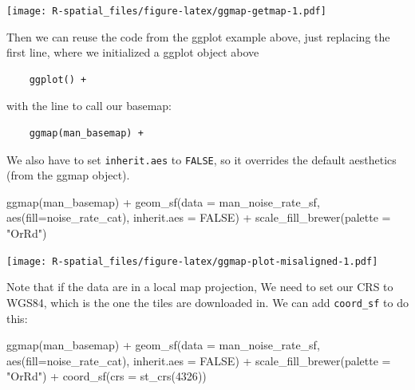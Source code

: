 \documentclass[
  11pt,
]{book}
\newenvironment{Shaded}{\begin{snugshade}}{\end{snugshade}}
\newcommand{\AttributeTok}[1]{\textcolor[rgb]{0.77,0.63,0.00}{#1}}
\newcommand{\ConstantTok}[1]{\textcolor[rgb]{0.00,0.00,0.00}{#1}}
\newcommand{\DecValTok}[1]{\textcolor[rgb]{0.00,0.00,0.81}{#1}}
\newcommand{\FunctionTok}[1]{\textcolor[rgb]{0.00,0.00,0.00}{#1}}
\newcommand{\NormalTok}[1]{#1}
\newcommand{\SpecialCharTok}[1]{\textcolor[rgb]{0.00,0.00,0.00}{#1}}
\newcommand{\StringTok}[1]{\textcolor[rgb]{0.31,0.60,0.02}{#1}}
\begin{document}
\texttt{[image: R-spatial\_files/figure-latex/ggmap-getmap-1.pdf]}

Then we can reuse the code from the ggplot example above, just replacing the first line, where we initialized a ggplot object above

\begin{verbatim}
    ggplot() + 
\end{verbatim}

with the line to call our basemap:

\begin{verbatim}
    ggmap(man_basemap) +
\end{verbatim}

We also have to set \texttt{inherit.aes} to \texttt{FALSE}, so it overrides the default aesthetics (from the ggmap object).

\begin{Shaded}
\begin{Highlighting}[]
\FunctionTok{ggmap}\NormalTok{(man\_basemap) }\SpecialCharTok{+}
  \FunctionTok{geom\_sf}\NormalTok{(}\AttributeTok{data =}\NormalTok{ man\_noise\_rate\_sf, }\FunctionTok{aes}\NormalTok{(}\AttributeTok{fill=}\NormalTok{noise\_rate\_cat), }\AttributeTok{inherit.aes =} \ConstantTok{FALSE}\NormalTok{) }\SpecialCharTok{+}
  \FunctionTok{scale\_fill\_brewer}\NormalTok{(}\AttributeTok{palette =} \StringTok{"OrRd"}\NormalTok{)}
\end{Highlighting}
\end{Shaded}

\texttt{[image: R-spatial\_files/figure-latex/ggmap-plot-misaligned-1.pdf]}

Note that if the data are in a local map projection, We need to set our CRS to WGS84, which is the one the tiles are downloaded in. We can add \texttt{coord\_sf} to do this:

\begin{Shaded}
\begin{Highlighting}[]
\FunctionTok{ggmap}\NormalTok{(man\_basemap) }\SpecialCharTok{+}
    \FunctionTok{geom\_sf}\NormalTok{(}\AttributeTok{data =}\NormalTok{ man\_noise\_rate\_sf, }\FunctionTok{aes}\NormalTok{(}\AttributeTok{fill=}\NormalTok{noise\_rate\_cat), }\AttributeTok{inherit.aes =} \ConstantTok{FALSE}\NormalTok{) }\SpecialCharTok{+}
    \FunctionTok{scale\_fill\_brewer}\NormalTok{(}\AttributeTok{palette =} \StringTok{"OrRd"}\NormalTok{) }\SpecialCharTok{+}
    \FunctionTok{coord\_sf}\NormalTok{(}\AttributeTok{crs =} \FunctionTok{st\_crs}\NormalTok{(}\DecValTok{4326}\NormalTok{))}
\end{Highlighting}
\end{Shaded}
\end{document}
